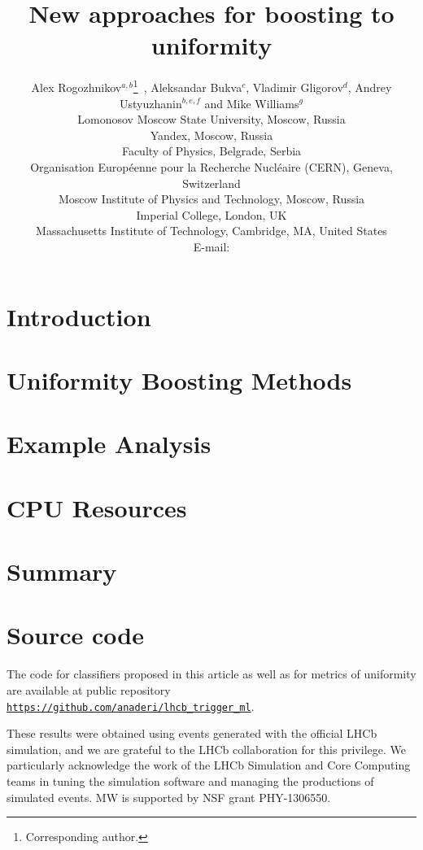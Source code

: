 \documentclass{JINST}
\title{New approaches for boosting to uniformity}
\author{
Alex Rogozhnikov$^{a,b}$\thanks{Corresponding author.}~,
Aleksandar Bukva$^c$, 
Vladimir Gligorov$^d$,
Andrey Ustyuzhanin$^{b,e,f}$ and
Mike Williams$^g$\\
\llap{$^a$}Lomonosov Moscow State University, Moscow, Russia\\
\llap{$^b$}Yandex, Moscow, Russia\\
\llap{$^c$}Faculty of Physics, Belgrade, Serbia \\
\llap{$^d$}Organisation Europ\'eenne pour la Recherche Nucl\'eaire (CERN), Geneva, Switzerland  \\
\llap{$^e$}Moscow Institute of Physics and Technology, Moscow, Russia\\
\llap{$^f$}Imperial College, London, UK\\
\llap{$^g$}Massachusetts Institute of Technology, Cambridge, MA, United States \\
E-mail: \email{alex.rogozhnikov@yandex.ru}}
\theoremstyle{definition}
\theoremstyle{remark}
\begin{document}
\maketitle


\section{Introduction}



\section{Uniformity Boosting Methods}


\section{Example Analysis}




\section{CPU Resources}



\section{Summary}



\section{Source code}

The code for classifiers proposed in this article as well as for metrics of uniformity are available at public repository 
{\tt \href{https://github.com/anaderi/lhcb_trigger_ml}{https://github.com/anaderi/lhcb\_trigger\_ml}}.

\acknowledgments

These results were obtained using events generated with the official LHCb simulation, and we are grateful to the LHCb collaboration for this privilege. 
We particularly acknowledge the work of the LHCb Simulation and Core Computing teams in tuning the simulation software and managing the productions of simulated events.
MW is supported by NSF grant PHY-1306550.
\end{document}
